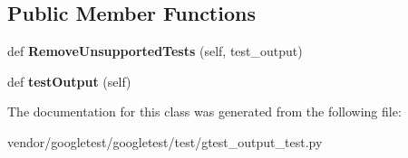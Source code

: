 \subsection*{Public Member Functions}
\begin{DoxyCompactItemize}
\item 
def {\bfseries Remove\+Unsupported\+Tests} (self, test\+\_\+output)\hypertarget{classgtest__output__test_1_1GTestOutputTest_a63f62268f795adfc5ca91514dbec2873}{}\label{classgtest__output__test_1_1GTestOutputTest_a63f62268f795adfc5ca91514dbec2873}

\item 
def {\bfseries test\+Output} (self)\hypertarget{classgtest__output__test_1_1GTestOutputTest_a1e6b96f68c5bcb8271de3208fa7f9f64}{}\label{classgtest__output__test_1_1GTestOutputTest_a1e6b96f68c5bcb8271de3208fa7f9f64}

\end{DoxyCompactItemize}


The documentation for this class was generated from the following file\+:\begin{DoxyCompactItemize}
\item 
vendor/googletest/googletest/test/gtest\+\_\+output\+\_\+test.\+py\end{DoxyCompactItemize}
